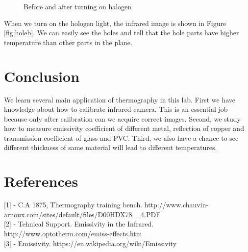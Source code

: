 \documentclass[english]{article}
\begin{document}
\begin{figure}[H]
	\centering
	\caption{Before and after turning on halogen}
	\label{fig:hole}
\end{figure}

When we turn on the hologen light, the infrared image is shown in Figure \ref{fig:holeb}. We can easily see the holes and tell that the hole parts have higher temperature than other parts in the plane.

\section{Conclusion}
We learn several main application of thermography in this lab. First we have knowledge about how to calibrate infrared camera. This is an essential job because only after calibration can we acquire correct images. Second, we study how to measure emissivity coefficient of different metal, reflection of copper and transmission coefficient of glass and PVC. Third, we also have a chance to see different thickness of same material will lead to different temperatures.

\section{References}
{[}1{]} - C.A 1875, Thermography training bench. http://www.chauvin-arnoux.com/sites/default/files/D00HDX78\
_4.PDF\\
{[}2{]} - Tehnical Support. Emissivity in the Infrared. http://www.optotherm.com/emiss-effects.htm\\
{[}3{]} - Emissivity. https://en.wikipedia.org/wiki/Emissivity
\end{document}
